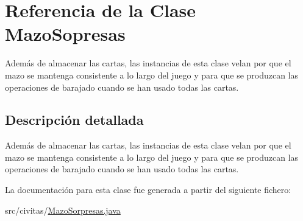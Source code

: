 \hypertarget{classMazoSopresas}{}\section{Referencia de la Clase Mazo\+Sopresas}
\label{classMazoSopresas}


Además de almacenar las cartas, las instancias de esta clase velan por que el mazo se mantenga consistente a lo largo del juego y para que se produzcan las operaciones de barajado cuando se han usado todas las cartas.  




\subsection{Descripción detallada}
Además de almacenar las cartas, las instancias de esta clase velan por que el mazo se mantenga consistente a lo largo del juego y para que se produzcan las operaciones de barajado cuando se han usado todas las cartas. 

La documentación para esta clase fue generada a partir del siguiente fichero\+:\begin{DoxyCompactItemize}
\item 
src/civitas/\hyperlink{MazoSorpresas_8java}{Mazo\+Sorpresas.\+java}\end{DoxyCompactItemize}
